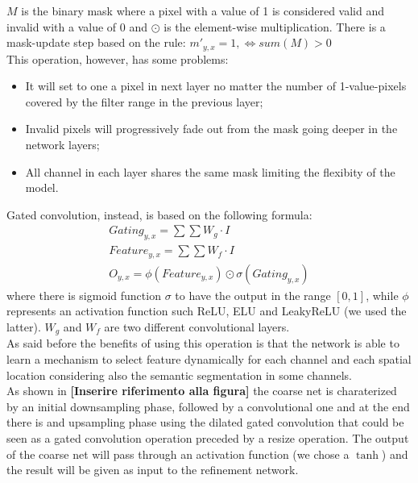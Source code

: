 \documentclass[10pt,twocolumn,letterpaper]{article}
\begin{document}
\(M\) is the binary mask where a pixel with a value of 1 is considered valid and invalid with a value of 0 and \(\odot\) is the element-wise multiplication.
There is a mask-update step based on the rule: \(m'_{y,x} = 1, \iff sum(M) > 0\)
\\
This operation, however, has some problems:
\begin{itemize}
    \item 
    It will set to one a pixel in next layer no matter the number of 1-value-pixels covered by the filter range in the previous layer;
    \item
    Invalid pixels will progressively fade out from the mask going deeper in the network layers;
    \item
    All channel in each layer shares the same mask limiting the flexibity of the model.
\end{itemize}
Gated convolution, instead, is based on the following formula:
\begin{gather}
    Gating_{y,x} = \sum \sum W_g \cdot I \\
    Feature_{y,x} = \sum \sum W_f \cdot I \\
    O_{y,x} = \phi (Feature_{y,x}) \odot \sigma (Gating_{y,x})
\end{gather}
where there is sigmoid function \(\sigma\) to have the output in the range \([0,1]\), while \(\phi\) represents an activation function such ReLU, ELU and LeakyReLU (we used the latter). \(W_g\) and \(W_f\) are two different convolutional layers.
\\
As said before the benefits of using this operation is that the network is able to learn a mechanism to select feature dynamically for each channel and each spatial location considering also the semantic segmentation in some channels.
\\
As shown in \textbf{[Inserire riferimento alla figura]} the coarse net is charaterized by an initial downsampling phase, followed by a convolutional one and at the end there is and upsampling phase using the dilated gated convolution that could be seen as a gated convolution operation preceded by a resize operation. The output of the coarse net will pass through an activation function (we chose a \(\tanh\)) and the result will be given as input to the refinement network.
\end{document}
